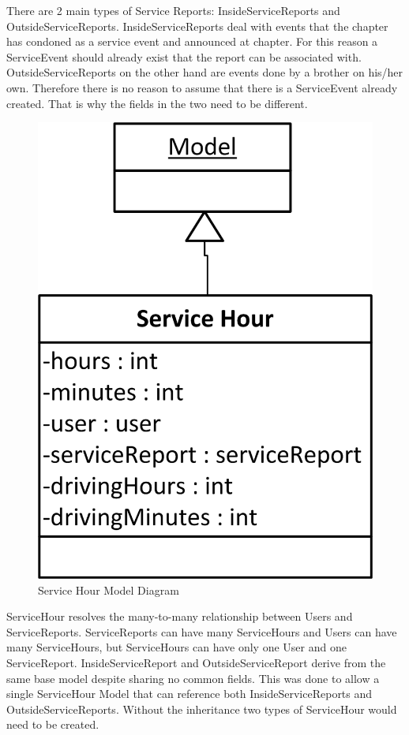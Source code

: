 \documentclass{article}
\begin{document}
There are 2 main types of Service Reports: InsideServiceReports and OutsideServiceReports. InsideServiceReports deal with events that the chapter has condoned as a service event and announced at chapter. For this reason a ServiceEvent should already exist that the report can be associated with. OutsideServiceReports on the other hand are events done by a brother on his/her own. Therefore there is no reason to assume that there is a ServiceEvent already created. That is why the fields in the two need to be different.

\FloatBarrier
\begin{figure}[h!]
\centering
\includegraphics[scale=.65]{img/modelDiagrams/serviceHourModel}
\caption{Service Hour Model Diagram}
\label{fig:serviceHourModelDiagram}
\end{figure}
\FloatBarrier

ServiceHour resolves the many-to-many relationship between Users and ServiceReports. ServiceReports can have many ServiceHours and Users can have many ServiceHours, but ServiceHours can have only one User and one ServiceReport. InsideServiceReport and OutsideServiceReport derive from the same base model despite sharing no common fields. This was done to allow a single ServiceHour Model that can reference both InsideServiceReports and OutsideServiceReports. Without the inheritance two types of ServiceHour would need to be created.
\end{document}
